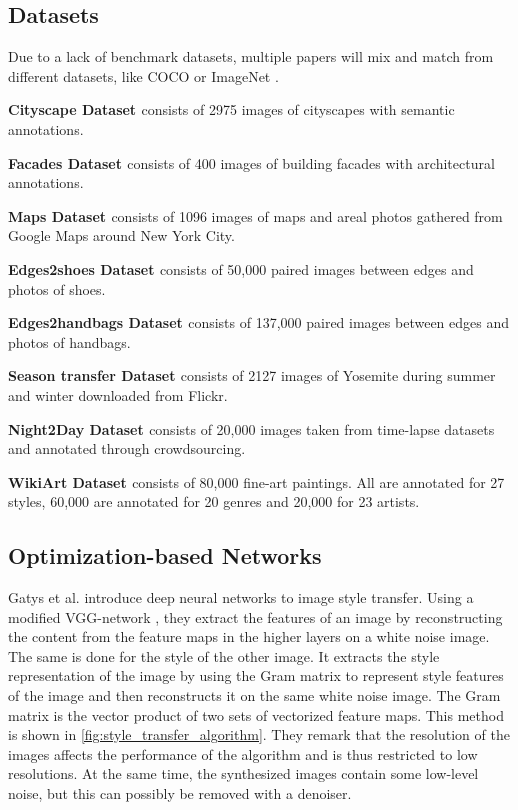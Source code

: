 \subsection{Datasets}
Due to a lack of benchmark datasets, multiple papers will mix and match from different datasets, like \gls{COCO} or ImageNet \cite{Deng2009}.

\textbf{Cityscape Dataset \cite{Cordts2016}} consists of 2975 images of cityscapes with semantic annotations.

\textbf{Facades Dataset \cite{Tylecek2013}} consists of 400 images of building facades with architectural annotations.

\textbf{Maps Dataset \cite{Isola2016}} consists of 1096 images of maps and areal photos gathered from Google Maps around New York City.

\textbf{Edges2shoes Dataset \cite{Yu2014}} consists of 50,000 paired images between edges and photos of shoes.

\textbf{Edges2handbags Dataset \cite{Zhu2016}} consists of 137,000 paired images between edges and photos of handbags.

\textbf{Season transfer Dataset \cite{Zhu2017}} consists of 2127 images of Yosemite during summer and winter downloaded from Flickr.

\textbf{Night2Day Dataset \cite{Laffont2014}} consists of 20,000 images taken from time-lapse datasets and annotated through crowdsourcing.

\textbf{WikiArt Dataset \cite{Tan2018}} consists of 80,000 fine-art paintings.
All are annotated for 27 styles, 60,000 are annotated for 20 genres and 20,000 for 23 artists.

\subsection{Optimization-based Networks}
Gatys et al. \cite{Gatys2016} introduce deep neural networks to image style transfer.
Using a modified VGG-network \cite{Simonyan2015}, they extract the features of an image by reconstructing the content from the feature maps in the higher layers on a white noise image.
The same is done for the style of the other image.
It extracts the style representation of the image by using the Gram matrix to represent style features of the image and then reconstructs it on the same white noise image.
The Gram matrix is the vector product of two sets of vectorized feature maps.
This method is shown in \ref{fig:style_transfer_algorithm}.
They remark that the resolution of the images affects the performance of the algorithm and is thus restricted to low resolutions.
At the same time, the synthesized images contain some low-level noise, but this can possibly be removed with a denoiser.

